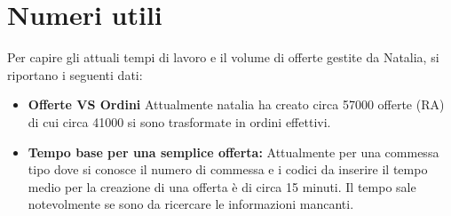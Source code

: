 \documentclass[12pt, a4paper]{article} %
\begin{document}
\section{Numeri utili}
Per capire gli attuali tempi di lavoro e il volume di offerte gestite da Natalia, si riportano i seguenti dati:
\begin{itemize}
      \item \textbf{Offerte VS Ordini} Attualmente natalia ha creato circa 57000 offerte (RA) di cui circa 41000 si sono trasformate in ordini effettivi.
      \item \textbf{Tempo base per una semplice offerta:} Attualmente per una commessa tipo dove si conosce il numero di commessa e i codici da inserire
            il tempo medio per la creazione di una offerta è di circa 15 minuti.
            Il tempo sale notevolmente se sono da ricercare le informazioni mancanti.
\end{itemize}
\end{document}
